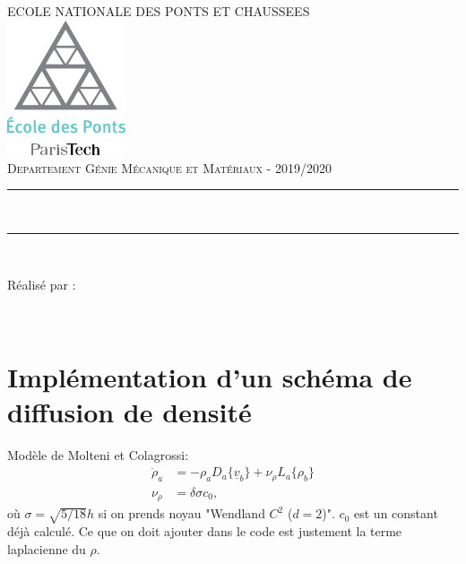 \documentclass{article}
\newcommand\ul[1]{\underline{#1}}
\begin{document}
\lstset{language=matlab}   

\begin{titlepage}
	\thispagestyle{empty}
	\newcommand{\HRule}{\rule{\linewidth}{0.5mm}}
	\center
	\textsc{\large ECOLE NATIONALE DES PONTS ET CHAUSSEES}\\[.7cm]
	\includegraphics[width=35mm]{img/ENPC_logo.png}\\[.5cm]
	\textsc{\large Departement Génie Mécanique et Matériaux - 2019/2020}\\[0.5cm]
	
	\vspace{2cm}
	
	\HRule \\[0.4cm]
	{\LARGE {\selectfont {SPH : Projet}}
    \vspace{0.4cm}
	\HRule \\[.5cm]

\vspace{3cm}

\large Réalisé par : 

\vspace{0.5cm}

{}
\\
\vspace{1cm}


}
\end{titlepage}


\newpage
\section{Implémentation d'un schéma de diffusion de densité}
Modèle de Molteni et Colagrossi: 
\begin{align*}
	\dot{\rho}_a &= -\rho_{a}D_{a}\{\ul{v}_{b}\}+\nu_{\rho}L_{a}\{\rho_{b}\}\\
	\nu_{\rho} &= \delta\sigma c_{0}, 
\end{align*}
où $\sigma=\sqrt{5/18}h$ si on prends noyau "Wendland $C^2$ ($d=2$)". $c_0$ est un constant déjà calculé. Ce que on doit ajouter dans le code est justement la terme laplacienne du $\rho$.
\end{document}
